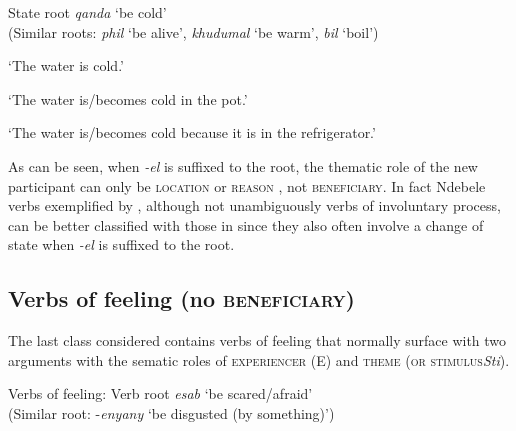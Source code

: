 \documentclass[output=paper]{langsci/langscibook}
\begin{document}
\ea\label{ex:sibanda:16}
\settowidth{}
{State root \textit{qanda} ‘be cold’}\\
 (Similar roots: \textit{phil} ‘be alive’, \textit{khudumal} ‘be warm’, \textit{bil} ‘boil’)\\

\glt ‘The water is cold.’


\glt ‘The water is/becomes cold in the pot.’


\glt ‘The water is/becomes cold because it is in the refrigerator.’
\z
\z

As can be seen, when \textit{-el} is suffixed to the root, the thematic role of the new participant can only be \textsc{location}  or \textsc{reason} , not \textsc{beneficiary}. In fact Ndebele verbs exemplified by , although not unambiguously verbs of involuntary process, can be better classified with those in  since they also often involve a change of state when \textit{-el} is suffixed to the root.

\subsection{Verbs of feeling (no \textsc{beneficiary)}}\label{sec:sibanda:4.6}

The last class considered contains verbs of feeling that normally surface with two arguments with the sematic roles of \textsc{experiencer} (E) and \textsc{theme} (\textsc{or stimulus}\textit {Sti}). 

\ea\label{ex:sibanda:17}
\settowidth{}
{Verbs of feeling: Verb root \textit{esab} ‘be scared/afraid’}\\
 (Similar root: -\textit{enyany} ‘be disgusted (by something)’)\\
\end{document}
